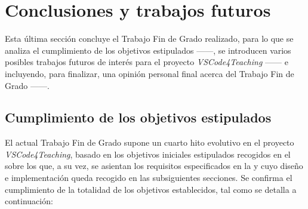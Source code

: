 \chapter{Conclusiones y trabajos futuros}
\label{cap:conclusiones}

Esta última sección concluye el Trabajo Fin de Grado realizado, para lo que se analiza el cumplimiento de los objetivos estipulados ------, se introducen varios posibles trabajos futuros de interés para el proyecto \textit{VSCode4Teaching} ------ e incluyendo, para finalizar, una opinión personal final acerca del Trabajo Fin de Grado ------.

\section{Cumplimiento de los objetivos estipulados}
\label{subsec:cumplimientoObjetivos}
El actual Trabajo Fin de Grado supone un cuarto hito evolutivo en el proyecto \textit{VSCode4Teaching}, basado en los objetivos iniciales estipulados recogidos en el  sobre los que, a su vez, se asientan los requisitos especificados en la  y cuyo diseño e implementación queda recogido en las subsiguientes secciones. Se confirma el cumplimiento de la totalidad de los objetivos establecidos, tal como se detalla a continuación:

